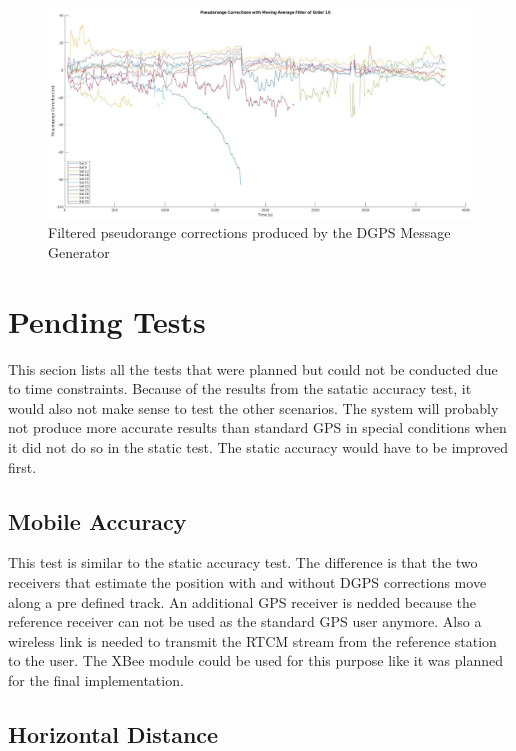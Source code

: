 \begin{figure}[!h]
 \centering
 \includegraphics[height=0.4\textheight]{images/PRCs_filtered.jpg}
 \caption{Filtered pseudorange corrections produced by the DGPS Message Generator}
 \label{fig:prcs_filtered}
\end{figure}

\section{Pending Tests}\label{sec:pending_tests}

This secion lists all the tests that were planned but could not be conducted due to time constraints.
Because of the results from the satatic accuracy test, it would also not make sense to test the other scenarios.
The system will probably not produce more accurate results than standard GPS in special conditions when it did not do so in the static test.
The static accuracy would have to be improved first.

\subsection{Mobile Accuracy}

This test is similar to the static accuracy test.
The difference is that the two receivers that estimate the position with and without DGPS corrections move along a pre defined track.
An additional GPS receiver is nedded because the reference receiver can not be used as the standard GPS user anymore.
Also a wireless link is needed to transmit the RTCM stream from the reference station to the user.
The XBee module could be used for this purpose like it was planned for the final implementation.

\subsection{Horizontal Distance}

